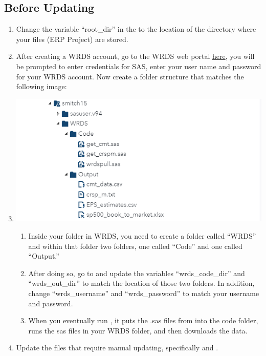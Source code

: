 \documentclass{article}
\begin{document}
	\subsection{Before Updating}
	
	\begin{enumerate}
		\item Change the variable ``root\_dir'' in the  to the location of the directory where your files (ERP Project) are stored. 
		\item After creating a WRDS account, go to the WRDS web portal \href{https://wrds-cloud.wharton.upenn.edu/SASStudio/}{here}, you will be prompted to enter credentials for SAS, enter your user name and password for your WRDS account. Now create a folder structure that matches the following image: 	
		\item \includegraphics{WRDSfilestructure.PNG}
		\begin{enumerate}
			\item Inside your folder in WRDS, you need to create a folder called ``WRDS'' and within that folder two folders, one called ``Code'' and one called ``Output.'' 
			\item After doing so, go to  and update the variables ``wrds\_code\_dir'' and ``wrds\_out\_dir'' to match the location of those two folders. In addition, change ``wrds\_username'' and ``wrds\_password'' to match your username and password. 
			\item When you eventually run  , it puts the .sas files from  into the code folder, runs the sas files in your WRDS folder, and then downloads the data.
		\end{enumerate}  
		\item Update the files that require manual updating, specifically  and . 

\end{enumerate}
\end{document}
